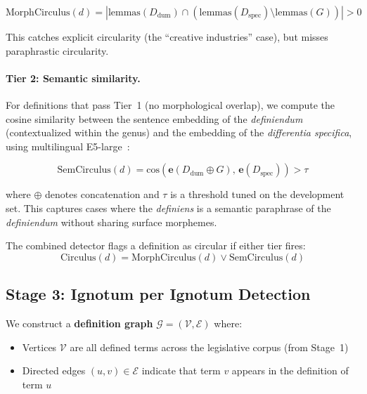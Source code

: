 \documentclass[11pt]{article}
\begin{document}
\begin{equation}
\text{MorphCirculus}(d) = |\text{lemmas}(D_{\text{dum}}) \cap (\text{lemmas}(D_{\text{spec}}) \setminus \text{lemmas}(G))| > 0
\end{equation}

This catches explicit circularity (the ``creative industries'' case), but misses paraphrastic circularity.

\paragraph{Tier 2: Semantic similarity.}
For definitions that pass Tier~1 (no morphological overlap), we compute the cosine similarity between the sentence embedding of the \emph{definiendum} (contextualized within the genus) and the embedding of the \emph{differentia specifica}, using multilingual E5-large~\citep{wang2024multilingual}:

\begin{equation}
\text{SemCirculus}(d) = \text{cos}(\mathbf{e}(D_{\text{dum}} \oplus G),\, \mathbf{e}(D_{\text{spec}})) > \tau
\end{equation}

\noindent where $\oplus$ denotes concatenation and $\tau$ is a threshold tuned on the development set.
This captures cases where the \emph{definiens} is a semantic paraphrase of the \emph{definiendum} without sharing surface morphemes.

The combined detector flags a definition as circular if either tier fires:
\begin{equation}
\text{Circulus}(d) = \text{MorphCirculus}(d) \lor \text{SemCirculus}(d)
\end{equation}

\subsection{Stage 3: Ignotum per Ignotum Detection}
\label{sec:ignotum-method}

We construct a \textbf{definition graph} $\mathcal{G} = (\mathcal{V}, \mathcal{E})$ where:
\begin{itemize}[nosep,leftmargin=*]
  \item Vertices $\mathcal{V}$ are all defined terms across the legislative corpus (from Stage~1)
  \item Directed edges $(u, v) \in \mathcal{E}$ indicate that term $v$ appears in the definition of term $u$
\end{itemize}
\end{document}
